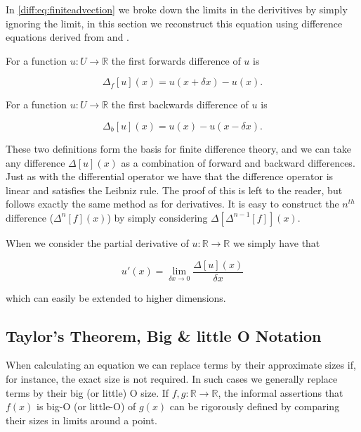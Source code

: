 \documentclass[../main.tex]{subfiles}
\begin{document}
  In \autoref{diff:eq:finiteadvection} we broke down the limits in the derivitives by simply ignoring the limit, in this section we reconstruct this equation using difference equations derived from \cite{boole1880} and \cite{hildebrand1987}.

  \begin{definition}
    For a function $u: U \to \mathbb{R}$ the first forwards difference of $u$ is

    \begin{equation}
      \Delta_f[u](x) = u(x + \delta x) - u(x).
    \end{equation}
  \end{definition}

  \begin{definition}
    For a function $u: U \to \mathbb{R}$ the first backwards difference of $u$ is

    \begin{equation}
      \Delta_b[u](x) = u(x) - u(x - \delta x).
    \end{equation}
  \end{definition}

  These two definitions form the basis for finite difference theory, and we can take any difference $\Delta[u](x)$ as a combination of forward and backward differences. Just as with the differential operator we have that the difference operator is linear and satisfies the Leibniz rule. The proof of this is left to the reader, but follows exactly the same method as for derivatives. It is easy to construct the $n^{th}$ difference ($\Delta ^n[f](x)$) by simply considering $\Delta [\Delta ^{n-1}[f]](x)$.

  When we consider the partial derivative of $u: \mathbb{R} \to \mathbb{R}$ we simply have that

  \begin{equation}
    u'(x) = \lim_{\delta x \to 0} \frac{\Delta[u](x)}{\delta x}
  \end{equation}

  which can easily be extended to higher dimensions.

  \subsection{Taylor's Theorem,  Big \& little O Notation}
  When calculating an equation we can replace terms by their approximate sizes if, for instance, the exact size is not required. In such cases we generally replace terms by their big (or little) O size. If $f, g : \mathbb{R} \to \mathbb{R}$, the informal assertions that $f(x)$ is big-O (or little-O) of $g(x)$ can be rigorously defined by comparing their sizes in limits around a point.
\end{document}
